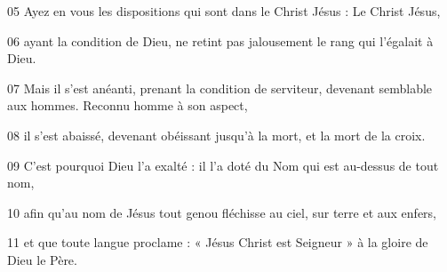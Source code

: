 05 Ayez en vous les dispositions qui sont dans le Christ Jésus : Le Christ Jésus,

06 ayant la condition de Dieu, ne retint pas jalousement le rang qui l’égalait à Dieu.

07 Mais il s’est anéanti, prenant la condition de serviteur, devenant semblable aux hommes. Reconnu homme à son aspect,

08 il s’est abaissé, devenant obéissant jusqu’à la mort, et la mort de la croix.

09 C’est pourquoi Dieu l’a exalté : il l’a doté du Nom qui est au-dessus de tout nom,

10 afin qu’au nom de Jésus tout genou fléchisse au ciel, sur terre et aux enfers,

11 et que toute langue proclame : « Jésus Christ est Seigneur » à la gloire de Dieu le Père.